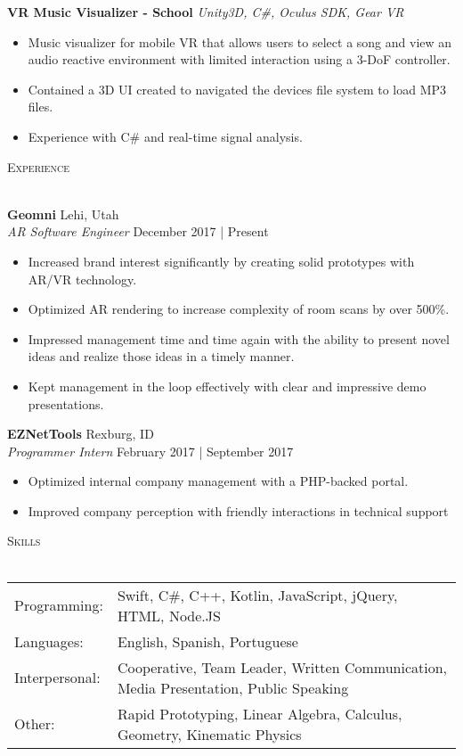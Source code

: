 \documentclass[a4paper]{article}
\newcommand{\lineunder} {
    \vspace*{-8pt} \\
    \hspace*{-18pt} \hrulefill \\
}
\newcommand{\header} [1] {
    {\hspace*{-18pt}\vspace*{6pt} \textsc{#1}}
    \vspace*{-6pt} \lineunder
}
\begin{document}
{\textbf{VR Music Visualizer - School}} {\sl Unity3D, C\#, Oculus SDK, Gear VR} \\
\vspace{-3mm}
\begin{itemize} \itemsep 1pt
	\item Music visualizer for mobile VR that allows users to select a song and view an audio reactive environment with limited interaction using a 3-DoF controller.
	\item Contained a 3D UI created to navigated the devices file system to load MP3 files.
	\item Experience with C\# and real-time signal analysis.
\end{itemize}

\vspace*{2mm}

\header{Experience}
\vspace{1mm}

\textbf{Geomni} \hfill Lehi, Utah\\
\textit{AR Software Engineer} \hfill December 2017 | Present\\
\vspace{-3mm}
\begin{itemize} \itemsep 1pt
	\item Increased brand interest significantly by creating solid prototypes with AR/VR technology.
	\item Optimized AR rendering to increase complexity of room scans by over 500\%. 
	\item Impressed management time and time again with the ability to present novel ideas and realize those ideas in a timely manner.
	\item Kept management in the loop effectively with clear and impressive demo presentations. 
\end{itemize}
\textbf{EZNetTools} \hfill Rexburg, ID\\
\textit{Programmer Intern} \hfill February 2017 | September 2017\\
\vspace{-3mm}
\begin{itemize} \itemsep 1pt
	\item Optimized internal company management with a PHP-backed portal.
	\item Improved company perception with friendly interactions in technical support
\end{itemize}

\header{Skills}
\begin{tabular}{ l l }
	Programming: & Swift, C\#, C++, Kotlin, JavaScript, jQuery, HTML, Node.JS                                                  \\
	Languages:      & English, Spanish, Portuguese                                             \\
	Interpersonal:         & Cooperative, Team Leader, Written Communication, Media Presentation, Public Speaking         \\
	Other:                 & Rapid Prototyping, Linear Algebra, Calculus, Geometry, Kinematic Physics \\
\end{tabular}
\vspace{2mm}
\end{document}
